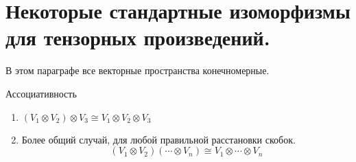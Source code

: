 ﻿\section{Некоторые стандартные изоморфизмы для тензорных произведений.}
В этом параграфе все векторные пространства конечномерные.

\begin{theorem}{Ассоциативность}\hfill
\begin{enumerate}
    \item $(V_1 \otimes V_2) \otimes V_3 \cong V_1 \otimes V_2 \otimes V_3$
    \item Более общий случай, для любой правильной расстановки скобок. 
    $$(V_1 \otimes V_2)(\cdots \otimes V_n) \cong  V_1 \otimes \cdots \otimes V_n$$
\end{enumerate}
\end{theorem}
